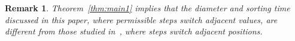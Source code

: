 \documentclass[11pt]{amsart}
\newtheorem{remark}[theorem]{Remark}
\numberwithin{equation}{section}
\newcommand{\todo}[1]{\vspace{5 mm}\par \noindent
\marginpar{\textsc{ToDo}} \framebox{\begin{minipage}[c]{0.95
\textwidth}
 #1 \end{minipage}}\vspace{5 mm}\par}
\begin{document}

\begin{remark}
Theorem~\ref{thm:main1} implies that the diameter and sorting time discussed in this paper, where permissible steps switch adjacent values, are different from those studied in~\cite{AAR}, where steps switch adjacent positions. 
\end{remark}


















\end{document}
